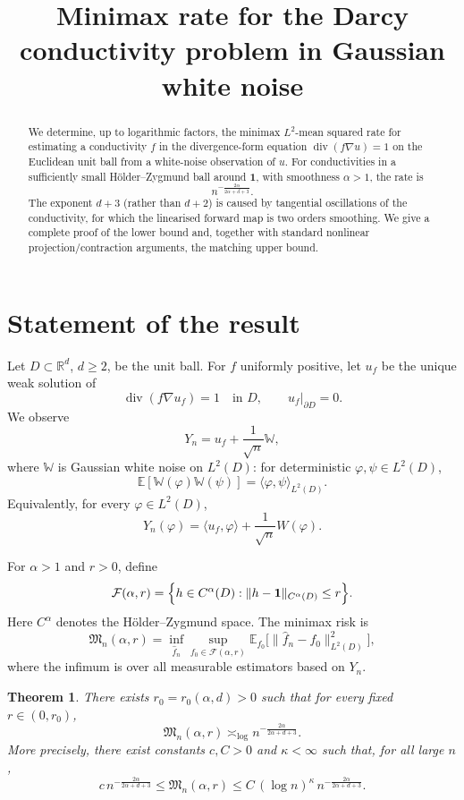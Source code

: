 \documentclass[11pt]{article}
\newcommand{\R}{\mathbb{R}}
\newcommand{\E}{\mathbb{E}}
\newcommand{\1}{\mathbf{1}}
\DeclareMathOperator{\diver}{div}
\newtheorem{theorem}{Theorem}
\begin{document}
\title{Minimax rate for the Darcy conductivity problem in Gaussian white noise}
\author{}
\date{}
\maketitle

\begin{abstract}
We determine, up to logarithmic factors, the minimax $L^2$-mean squared rate for estimating a conductivity $f$ in the divergence-form equation $\diver(f\nabla u)=1$ on the Euclidean unit ball from a white-noise observation of $u$. For conductivities in a sufficiently small Hölder--Zygmund ball around $\1$, with smoothness $\alpha>1$, the rate is
\[
n^{-\frac{2\alpha}{2\alpha+d+3}} .
\]
The exponent $d+3$ (rather than $d+2$) is caused by tangential oscillations of the conductivity, for which the linearised forward map is two orders smoothing. We give a complete proof of the lower bound and, together with standard nonlinear projection/contraction arguments, the matching upper bound.
\end{abstract}

\section{Statement of the result}

Let $D\subset \R^d$, $d\ge 2$, be the unit ball. For $f$ uniformly positive, let $u_f$ be the unique weak solution of
\[
\diver(f\nabla u_f)=1 \quad \text{in }D, 
\qquad 
u_f|_{\partial D}=0 .
\]
We observe
\[
Y_n = u_f + \frac1{\sqrt n}\mathbb W,
\]
where $\mathbb W$ is Gaussian white noise on $L^2(D)$: for deterministic $\varphi,\psi\in L^2(D)$,
\[
\E[\mathbb W(\varphi)\mathbb W(\psi)]=\langle \varphi,\psi\rangle_{L^2(D)}.
\]
Equivalently, for every $\varphi\in L^2(D)$,
\[
Y_n(\varphi)=\langle u_f,\varphi\rangle + \frac1{\sqrt n}W(\varphi).
\]

For $\alpha>1$ and $r>0$, define
\[
\mathcal F(\alpha,r)
=
\Bigl\{h\in C^\alpha(D): \|h-\1\|_{C^\alpha(D)}\le r\Bigr\}.
\]
Here $C^\alpha$ denotes the Hölder--Zygmund space. The minimax risk is
\[
\mathfrak M_n(\alpha,r)
=
\inf_{\widehat f_n}\sup_{f_0\in\mathcal F(\alpha,r)}
\E_{f_0}\bigl[\|\widehat f_n-f_0\|_{L^2(D)}^2\bigr],
\]
where the infimum is over all measurable estimators based on $Y_n$.

\begin{theorem}\label{thm:main}
There exists $r_0=r_0(\alpha,d)>0$ such that for every fixed $r\in(0,r_0)$,
\[
\mathfrak M_n(\alpha,r)
\asymp_{\log}
n^{-\frac{2\alpha}{2\alpha+d+3}} .
\]
More precisely, there exist constants $c,C>0$ and $\kappa<\infty$ such that, for all large $n$,
\[
c\, n^{-\frac{2\alpha}{2\alpha+d+3}}
\le
\mathfrak M_n(\alpha,r)
\le
C\,(\log n)^\kappa\, n^{-\frac{2\alpha}{2\alpha+d+3}} .
\]
\end{theorem}
\end{document}

